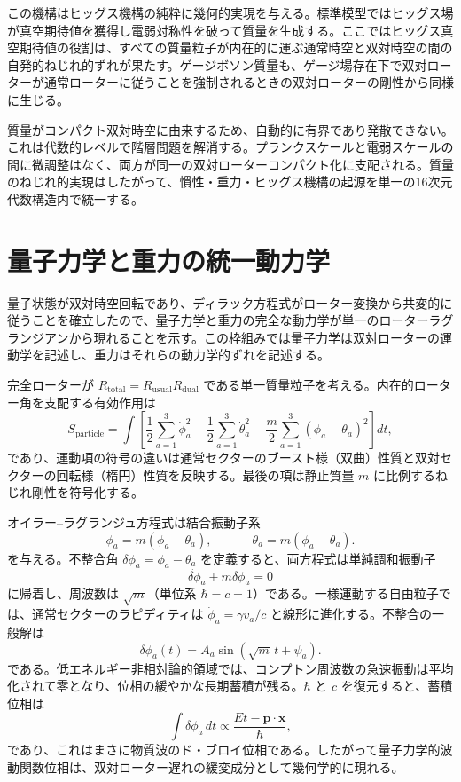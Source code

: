 \documentclass[a4paper]{article}
\begin{document}
この機構はヒッグス機構の純粋に幾何的実現を与える。標準模型ではヒッグス場が真空期待値を獲得し電弱対称性を破って質量を生成する。ここではヒッグス真空期待値の役割は、すべての質量粒子が内在的に運ぶ通常時空と双対時空の間の自発的ねじれ的ずれが果たす。ゲージボソン質量も、ゲージ場存在下で双対ローターが通常ローターに従うことを強制されるときの双対ローターの剛性から同様に生じる。

質量がコンパクト双対時空に由来するため、自動的に有界であり発散できない。これは代数的レベルで階層問題を解消する。プランクスケールと電弱スケールの間に微調整はなく、両方が同一の双対ローターコンパクト化に支配される。質量のねじれ的実現はしたがって、慣性・重力・ヒッグス機構の起源を単一の16次元代数構造内で統一する。

\section{量子力学と重力の統一動力学}
\label{sec:dynamics}

量子状態が双対時空回転であり、ディラック方程式がローター変換から共変的に従うことを確立したので、量子力学と重力の完全な動力学が単一のローターラグランジアンから現れることを示す。この枠組みでは量子力学は双対ローターの運動学を記述し、重力はそれらの動力学的ずれを記述する。

完全ローターが $R_\text{total} = R_\text{usual} R_\text{dual}$ である単一質量粒子を考える。内在的ローター角を支配する有効作用は
\[
S_\text{particle} = \int \left[ \frac{1}{2} \sum_{a=1}^3 \dot{\phi}_a^2 - \frac{1}{2} \sum_{a=1}^3 \dot{\theta}_a^2 - \frac{m}{2} \sum_{a=1}^3 (\phi_a - \theta_a)^2 \right] dt,
\]
であり、運動項の符号の違いは通常セクターのブースト様（双曲）性質と双対セクターの回転様（楕円）性質を反映する。最後の項は静止質量 $m$ に比例するねじれ剛性を符号化する。

オイラー--ラグランジュ方程式は結合振動子系
\[
\ddot{\phi}_a = m (\phi_a - \theta_a), \qquad -\ddot{\theta}_a = m (\phi_a - \theta_a).
\]
を与える。不整合角 $\delta\phi_a = \phi_a - \theta_a$ を定義すると、両方程式は単純調和振動子
\[
\ddot{\delta\phi}_a + m \delta\phi_a = 0
\]
に帰着し、周波数は $\sqrt{m}$（単位系 $\hbar = c = 1$）である。一様運動する自由粒子では、通常セクターのラピディティは $\dot{\phi}_a = \gamma v_a/c$ と線形に進化する。不整合の一般解は
\[
\delta\phi_a(t) = A_a \sin(\sqrt{m}\, t + \psi_a).
\]
である。低エネルギー非相対論的領域では、コンプトン周波数の急速振動は平均化されて零となり、位相の緩やかな長期蓄積が残る。$\hbar$ と $c$ を復元すると、蓄積位相は
\[
\int \delta\phi_a \, dt \propto \frac{E t - \mathbf{p} \cdot \mathbf{x}}{\hbar},
\]
であり、これはまさに物質波のド・ブロイ位相である。したがって量子力学的波動関数位相は、双対ローター遅れの緩変成分として幾何学的に現れる。
\end{document}
